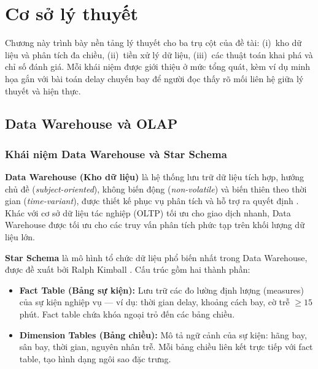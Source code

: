 \clearpage
\section{Cơ sở lý thuyết}
\label{sec:theory}

Chương này trình bày nền tảng lý thuyết cho ba trụ cột của đề tài:
(i)~kho dữ liệu và phân tích đa chiều,
(ii)~tiền xử lý dữ liệu,
(iii)~các thuật toán khai phá và chỉ số đánh giá.
Mỗi khái niệm được giới thiệu ở mức tổng quát, kèm ví dụ minh họa
gắn với bài toán delay chuyến bay để người đọc thấy rõ mối liên hệ
giữa lý thuyết và hiện thực.

\subsection{Data Warehouse và OLAP}

\subsubsection{Khái niệm Data Warehouse và Star Schema}

\textbf{Data Warehouse (Kho dữ liệu)} là hệ thống lưu trữ dữ liệu
tích hợp, hướng chủ đề (\textit{subject-oriented}),
không biến động (\textit{non-volatile}) và biến thiên theo thời gian
(\textit{time-variant}), được thiết kế phục vụ phân tích
và hỗ trợ ra quyết định \cite{inmon2005building}.
Khác với cơ sở dữ liệu tác nghiệp (OLTP) tối ưu cho giao dịch nhanh,
Data Warehouse được tối ưu cho các truy vấn phân tích phức tạp
trên khối lượng dữ liệu lớn.

\textbf{Star Schema} là mô hình tổ chức dữ liệu phổ biến nhất
trong Data Warehouse, được đề xuất bởi Ralph Kimball
\cite{kimball2013datawarehouse}. Cấu trúc gồm hai thành phần:
\begin{itemize}
    \item \textbf{Fact Table (Bảng sự kiện):}
          Lưu trữ các đo lường định lượng (measures) của sự kiện nghiệp vụ ---
          ví dụ: thời gian delay, khoảng cách bay, cờ trễ $\geq 15$ phút.
          Fact table chứa khóa ngoại trỏ đến các bảng chiều.
    \item \textbf{Dimension Tables (Bảng chiều):}
          Mô tả ngữ cảnh của sự kiện: hãng bay, sân bay, thời gian, nguyên nhân trễ.
          Mỗi bảng chiều liên kết trực tiếp với fact table,
          tạo hình dạng ngôi sao đặc trưng.
\end{itemize}

